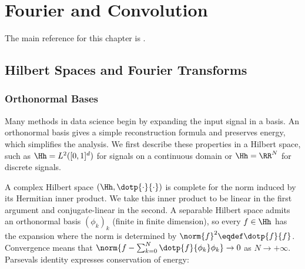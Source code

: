 
\chapter{Fourier and Convolution}
\label{sec-fourier}


The main reference for this chapter is \cite{mallat2008wavelet}.

\newcommand{\piN}{\frac{2\imath\pi}{N}}

\section{Hilbert Spaces and Fourier Transforms}

\subsection{Orthonormal Bases}

Many methods in data science begin by expanding the input signal in a basis. An orthonormal basis gives a simple reconstruction formula and preserves energy, which simplifies the analysis. We first describe these properties in a Hilbert space, such as $\Hh=L^2([0,1]^d)$ for signals on a continuous domain or $\Hh=\RR^N$ for discrete signals.

A complex Hilbert space $(\Hh,\dotp{\cdot}{\cdot})$ is complete for the norm induced by its Hermitian inner product. We take this inner product to be linear in the first argument and conjugate-linear in the second. A separable Hilbert space admits an orthonormal basis $(\phi_k)_k$ (finite in finite dimension), so every $f\in\Hh$ has the expansion
where the norm is determined by $\norm{f}^2 \eqdef \dotp{f}{f}$. Convergence means that $\norm{ f - \sum_{k=0}^N \dotp{f}{\phi_k} \phi_k } \rightarrow 0$ as $N \rightarrow +\infty$. Parseval\textquotesingle s identity expresses conservation of energy:

